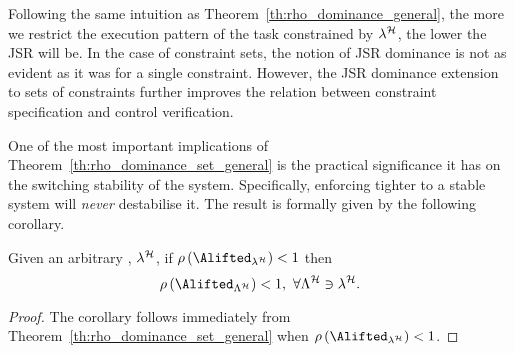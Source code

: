 Following the same intuition as Theorem~\ref{th:rho_dominance_general}, the more we restrict the execution pattern of the task constrained by $\lambda^{\mathcal{H}}$, the lower the JSR will be.
In the case of constraint sets, the notion of JSR dominance is not as evident as it was for a single constraint.
However, the JSR dominance extension to sets of constraints further improves the relation between constraint specification and control verification.

One of the most important implications of Theorem~\ref{th:rho_dominance_set_general} is the practical significance it has on the switching stability of the system.
Specifically, enforcing tighter \ewhc{} to a stable system will \emph{never} destabilise it.
The result is formally given by the following corollary.
\begin{corollary}%
    \label{cor:rho_dominance_set}%
    Given an arbitrary \ewhc{}, $\lambda^{\mathcal{H}}$, if $\rho \left( \Alifted_{\lambda^\strat} \right) < 1$ then
    $$\rho\left(\Alifted_{\Lambda^\strat}\right) < 1 ,\,\, \forall \Lambda^\strat \ni \lambda^\strat. $$

    \begin{proof}
        The corollary follows immediately from Theorem~\ref{th:rho_dominance_set_general} when $\rho \left( \Alifted_{\lambda^\strat} \right) < 1$.
    \end{proof}
\end{corollary}
